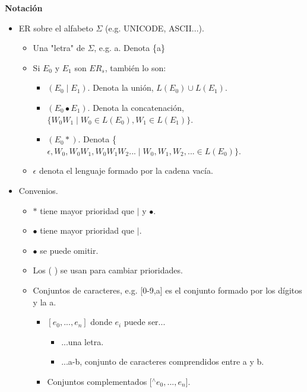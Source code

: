\documentclass[\main/Apuntes_PL.tex]{subfiles}
\begin{document}
      \newpage
      \par
      \textbf{\large Notación}
      \begin{itemize}
        \item ER sobre el alfabeto $\Sigma$ (e.g. UNICODE, ASCII...).
              \begin{itemize}
                \item Una "letra" de $\Sigma$, e.g. a. Denota \{a\}
                \item Si $E_0$ y $E_1$ son $ER_s$, también lo son:
                  \begin{itemize}
                    \item $(E_0 \mid E_1)$. Denota la unión, $L(E_0) \cup L(E_1).$
                    \item $(E_0 \bullet E_1)$. Denota la concatenación, $ \{W_0 W_1 \mid W_0 \in  L(E_0), W_1 \in L(E_1)\}$.
                    \item $(E_0 \ast)$. Denota \{$\epsilon, W_0, W_0 W_1, W_0 W_1 W_2 ...\mid W_0, W_1, W_2, ... \in L(E_0)\}$.
                  \end{itemize}
                \item $\epsilon$ denota el lenguaje formado por la cadena vacía.
              \end{itemize}
        \item Convenios.
              \begin{itemize}
                \item $\ast$ tiene mayor prioridad que $\mid$ y $\bullet$.
                \item $\bullet$ tiene mayor prioridad que $\mid$.
                \item $\bullet$ se puede omitir.
                \item Los ( ) se usan para cambiar prioridades.
                \item Conjuntos de caracteres, e.g. [0-9,a] es el conjunto formado por los dígitos y la a.
                  \begin{itemize}
                    \item $[e_0, ..., e_n]$ donde $e_i$ puede ser...
                      \begin{itemize}
                        \item ...una letra.
                        \item ...a-b, conjunto de caracteres comprendidos entre a y b.
                      \end{itemize}
                    \item Conjuntos complementados [$^\wedge e_0, ..., e_n$].

\end{itemize}
\end{itemize}
\end{itemize}
\end{document}
